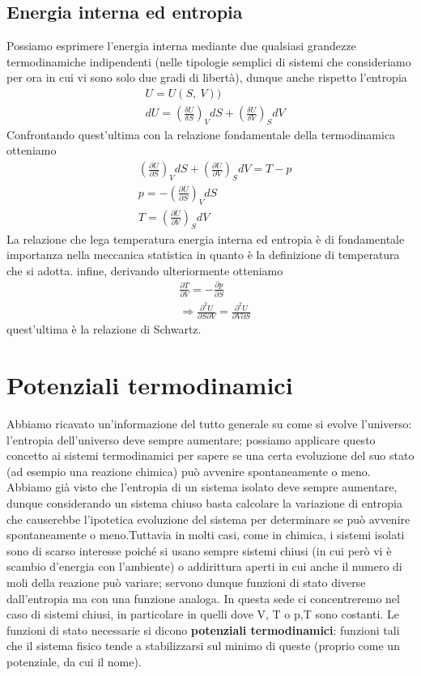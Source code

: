 \documentclass[10pt,a4paper]{article}
\begin{document}
\subsection{Energia interna ed entropia}
Possiamo esprimere l'energia interna mediante due qualsiasi grandezze termodinamiche indipendenti (nelle tipologie semplici di sistemi che consideriamo per ora in cui vi sono solo due gradi di libertà), dunque anche rispetto l'entropia
\begin{align*}
	&U = U(S,\ V))\\
	&dU = \left(\frac{\delta U}{\delta S}\right)_V dS + \left(\frac{\delta U}{\delta V}\right)_S dV
\end{align*} 
Confrontando quest'ultima con la relazione fondamentale della termodinamica otteniamo 
\begin{align}
	&\left(\frac{\partial U}{\partial S}\right)_V dS + \left(\frac{\partial U}{\partial V}\right)_S dV = T-p\nonumber\\
	&p = -\left(\frac{\partial U}{\partial S}\right)_V dS\nonumber\\
	& T=\left(\frac{\partial U}{\partial V}\right)_S dV\label{eq:temp_statistica}
\end{align}
La relazione che lega temperatura energia interna ed entropia è di fondamentale importanza nella meccanica statistica in quanto è la definizione di temperatura che si adotta. infine, derivando ulteriormente otteniamo
\begin{align*}
	&\frac{\partial T}{\partial V} = - \frac{\partial p}{\partial S}\\
	&\Rightarrow \frac{\partial^2 U}{\partial S\partial V} = \frac{\partial^2 U}{\partial V\partial S}
\end{align*}
quest'ultima è la relazione di Schwartz. 
\section{Potenziali termodinamici}
Abbiamo ricavato un'informazione del tutto generale su come si evolve l'universo: l'entropia dell'universo deve sempre aumentare; possiamo applicare questo concetto ai sistemi termodinamici per sapere se una certa evoluzione del suo stato (ad esempio una reazione chimica) può avvenire spontaneamente o meno. Abbiamo già visto che l'entropia di un sistema isolato deve sempre aumentare, dunque considerando un sistema chiuso basta calcolare la variazione di entropia che causerebbe l'ipotetica evoluzione del sistema per determinare se può avvenire spontaneamente o meno.Tuttavia in molti casi, come in chimica, i sistemi isolati sono di scarso interesse poiché si usano sempre sistemi chiusi (in cui però vi è scambio d'energia con l'ambiente) o addirittura aperti in cui anche il numero di moli della reazione può variare; servono dunque funzioni di stato diverse dall'entropia ma con una funzione analoga. In questa sede ci concentreremo nel caso di sistemi chiusi, in particolare in quelli dove V, T o p,T sono costanti. Le funzioni di stato necessarie si dicono \textbf{potenziali termodinamici}: funzioni tali che il sistema fisico tende a stabilizzarsi sul minimo di queste (proprio come un potenziale, da cui il nome). 
\end{document}
